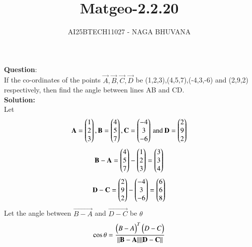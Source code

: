 \documentclass[journal,12pt,onecolumn]{IEEEtran}
\begin{document}
\title{Matgeo-2.2.20}
\author{AI25BTECH11027 - NAGA BHUVANA}
{\let\newpage\relax\maketitle}
\noindent
		\textbf{Question}:\\
        If the co-ordinates of the points $\vec{A},\vec{B},\vec{C},\vec{D}$ be (1,2,3),(4,5,7),(-4,3,-6) and (2,9,2) respectively, then find the angle between lines AB and CD.\\
\textbf{Solution:}\\
Let 
\begin{align}
    \mathbf{A}=\begin{pmatrix}1\\2\\3\end{pmatrix},\mathbf{B}=\begin{pmatrix}4\\5\\7\end{pmatrix},\mathbf{C}=\begin{pmatrix}-4\\3\\-6\end{pmatrix} \, \text{and} \:  \mathbf{D}=\begin{pmatrix}2\\9\\2\end{pmatrix}
\end{align}
\begin{align}
    \mathbf{B-A}=\begin{pmatrix}4\\5\\7\end{pmatrix}-\begin{pmatrix}1\\2\\3\end{pmatrix}=\begin{pmatrix}3\\3\\4\end{pmatrix}
\end{align}	
\begin{align}
    \mathbf{D-C}=\begin{pmatrix}2\\9\\2\end{pmatrix}-\begin{pmatrix}-4\\3\\-6\end{pmatrix}=\begin{pmatrix}6\\6\\8\end{pmatrix}
\end{align}
Let the angle between $\vec{B-A}$ and $\vec{D-C}$ be $\theta$
\begin{align}
    \cos{\theta}=\frac{\begin{pmatrix}B-A\end{pmatrix}^T \begin{pmatrix}D-C\end{pmatrix}}{\|\mathbf{B-A}\| \|\mathbf{D-C}\|}
\end{align}
\end{document}
